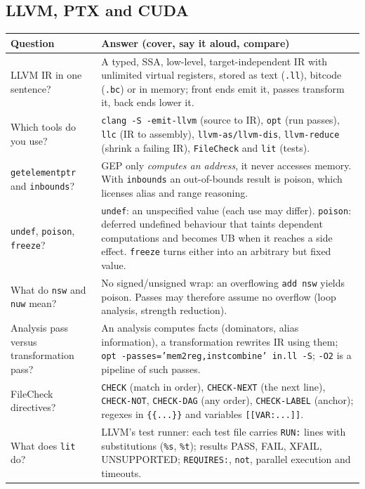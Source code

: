 \documentclass[10pt,a4paper,openany,oneside]{report}
\begin{document}
\subsection{LLVM, PTX and CUDA}
\begin{center}\small
\begin{xltabular}{\textwidth}{@{}L{4.6cm}Y@{}}
\toprule
\textbf{Question} & \textbf{Answer (cover, say it aloud, compare)}\\
\midrule\endhead
LLVM IR in one sentence? & A typed, SSA, low-level, target-independent IR with unlimited virtual registers, stored as text (\texttt{.ll}), bitcode (\texttt{.bc}) or in memory; front ends emit it, passes transform it, back ends lower it.\\
Which tools do you use? & \texttt{clang -S -emit-llvm} (source to IR), \texttt{opt} (run passes), \texttt{llc} (IR to assembly), \texttt{llvm-as/llvm-dis}, \texttt{llvm-reduce} (shrink a failing IR), \texttt{FileCheck} and \texttt{lit} (tests).\\
\texttt{getelementptr} and \texttt{inbounds}? & GEP only \emph{computes an address}, it never accesses memory. With \texttt{inbounds} an out-of-bounds result is poison, which licenses alias and range reasoning.\\
\texttt{undef}, \texttt{poison}, \texttt{freeze}? & \texttt{undef}: an unspecified value (each use may differ). \texttt{poison}: deferred undefined behaviour that taints dependent computations and becomes UB when it reaches a side effect. \texttt{freeze} turns either into an arbitrary but fixed value.\\
What do \texttt{nsw} and \texttt{nuw} mean? & No signed/unsigned wrap: an overflowing \texttt{add nsw} yields poison. Passes may therefore assume no overflow (loop analysis, strength reduction).\\
Analysis pass versus transformation pass? & An analysis computes facts (dominators, alias information), a transformation rewrites IR using them; \texttt{opt -passes='mem2reg,instcombine' in.ll -S}; \texttt{-O2} is a pipeline of such passes.\\
FileCheck directives? & \texttt{CHECK} (match in order), \texttt{CHECK-NEXT} (the next line), \texttt{CHECK-NOT}, \texttt{CHECK-DAG} (any order), \texttt{CHECK-LABEL} (anchor); regexes in \texttt{\{\{...\}\}} and variables \texttt{[[VAR:...]]}.\\
What does \texttt{lit} do? & LLVM's test runner: each test file carries \texttt{RUN:} lines with substitutions (\texttt{\%s}, \texttt{\%t}); results PASS, FAIL, XFAIL, UNSUPPORTED; \texttt{REQUIRES:}, \texttt{not}, parallel execution and timeouts.\\

\end{xltabular}
\end{center}
\end{document}
